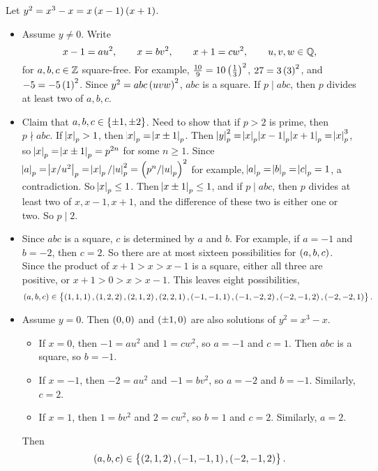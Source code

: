 \begin{example}
Let $ y^2 = x^3 - x = x\br{x - 1}\br{x + 1} $.
\begin{itemize}
\item Assume $ y \ne 0 $. Write
$$ x - 1 = au^2, \qquad x = bv^2, \qquad x + 1 = cw^2, \qquad u, v, w \in \mathbb{Q}, $$
for $ a, b, c \in \mathbb{Z} $ square-free. For example, $ \tfrac{10}{9} = 10\br{\tfrac{1}{3}}^2 $, $ 27 = 3\br{3}^2 $, and $ -5 = -5\br{1}^2 $. Since $ y^2 = abc\br{uvw}^2 $, $ abc $ is a square. If $ p \mid abc $, then $ p $ divides at least two of $ a, b, c $.
\item Claim that $ a, b, c \in \cbr{\pm 1, \pm 2} $. Need to show that if $ p > 2 $ is prime, then $ p \nmid abc $. If $ \abs{x}_p > 1 $, then $ \abs{x}_p = \abs{x \pm 1}_p $. Then $ \abs{y}_p^2 = \abs{x}_p\abs{x - 1}_p\abs{x + 1}_p = \abs{x}_p^3 $, so $ \abs{x}_p = \abs{x \pm 1}_p = p^{2n} $ for some $ n \ge 1 $. Since $ \abs{a}_p = \abs{x / u^2}_p = \abs{x}_p / \abs{u}_p^2 = \br{p^n / \abs{u}_p}^2 $ for example, $ \abs{a}_p = \abs{b}_p = \abs{c}_p = 1 $, a contradiction. So $ \abs{x}_p \le 1 $. Then $ \abs{x \pm 1}_p \le 1 $, and if $ p \mid abc $, then $ p $ divides at least two of $ x, x - 1, x + 1 $, and the difference of these two is either one or two. So $ p \mid 2 $.
\item Since $ abc $ is a square, $ c $ is determined by $ a $ and $ b $. For example, if $ a = -1 $ and $ b = -2 $, then $ c = 2 $. So there are at most sixteen possibilities for $ \br{a, b, c} $. Since the product of $ x + 1 > x > x - 1 $ is a square, either all three are positive, or $ x + 1 > 0 > x > x - 1 $. This leaves eight possibilities,
$$ \br{a, b, c} \in \cbr{\br{1, 1, 1}, \br{1, 2, 2}, \br{2, 1, 2}, \br{2, 2, 1}, \br{-1, -1, 1}, \br{-1, -2, 2}, \br{-2, -1, 2}, \br{-2, -2, 1}}. $$
\item Assume $ y = 0 $. Then $ \br{0, 0} $ and $ \br{\pm 1, 0} $ are also solutions of $ y^2 = x^3 - x $.
\begin{itemize}
\item If $ x = 0 $, then $ -1 = au^2 $ and $ 1 = cw^2 $, so $ a = -1 $ and $ c = 1 $. Then $ abc $ is a square, so $ b = -1 $.
\item If $ x = -1 $, then $ -2 = au^2 $ and $ -1 = bv^2 $, so $ a = -2 $ and $ b = -1 $. Similarly, $ c = 2 $.
\item If $ x = 1 $, then $ 1 = bv^2 $ and $ 2 = cw^2 $, so $ b = 1 $ and $ c = 2 $. Similarly, $ a = 2 $.
\end{itemize}
Then
$$ \br{a, b, c} \in \cbr{\br{2, 1, 2}, \br{-1, -1, 1}, \br{-2, -1, 2}}. $$

\end{itemize}
\end{example}
